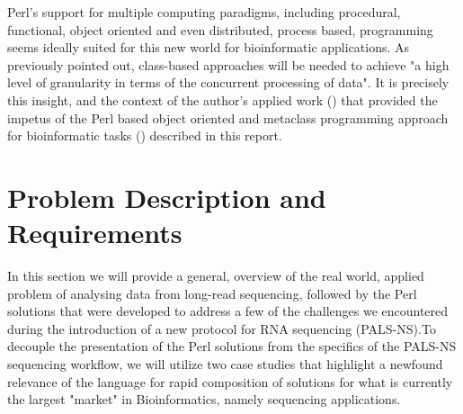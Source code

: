 \documentclass[10pt]{article}
\begin{document}
Perl's support for multiple computing paradigms, including procedural, functional, object oriented and even distributed, process based, programming seems ideally suited for this new world for bioinformatic applications. As previously pointed out, class-based approaches will be needed to achieve "a high level of granularity in terms of the concurrent processing of data"\cite{leipzig_review_2017}. It is precisely this insight, and the context of the author's applied work () that provided the impetus of the Perl based object oriented and metaclass programming approach for bioinformatic tasks () described in this report. 


\section{Problem Description and Requirements}
In this section we will provide a general, overview of the real world, applied problem of analysing data from long-read sequencing\cite{mackenzie_introduction_2023}, followed by the Perl solutions that were developed to address a few of the challenges we encountered during the introduction of a new protocol for RNA sequencing (PALS-NS)\cite{mackenzie_make_2022}.To decouple the presentation of the Perl solutions from the specifics of the PALS-NS sequencing workflow, we will utilize two case studies that highlight a newfound relevance of the language for rapid composition of solutions for what is currently the largest "market" in Bioinformatics, namely sequencing applications. 
\end{document}
